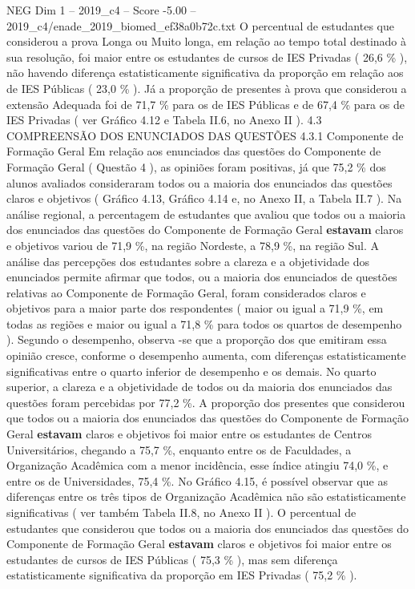 \begin{textsample}{NEG Dim 1 – 2019\_c4 – Score -5.00 – 2019\_c4/enade\_2019\_biomed\_ef38a0b72c.txt}
O percentual de estudantes que considerou a prova Longa ou Muito longa, em relação ao tempo total destinado à sua resolução, foi maior entre os estudantes de cursos de IES Privadas ( 26,6 \% ), não havendo diferença estatisticamente significativa da proporção em relação aos de IES Públicas ( 23,0 \% ).
Já a proporção de presentes à prova que considerou a extensão Adequada foi de 71,7 \% para os de IES Públicas e de 67,4 \% para os de IES Privadas ( ver Gráfico 4.12 e Tabela II.6, no Anexo II ). 4.3 COMPREENSÃO DOS ENUNCIADOS DAS QUESTÕES 4.3.1 Componente de Formação Geral Em relação aos enunciados das questões do Componente de Formação Geral ( Questão 4 ), as opiniões foram positivas, já que 75,2 \% dos alunos avaliados consideraram todos ou a maioria dos enunciados das questões claros e objetivos ( Gráfico 4.13, Gráfico 4.14 e, no Anexo II, a Tabela II.7 ).
Na análise regional, a percentagem de estudantes que avaliou que todos ou a maioria dos enunciados das questões do Componente de Formação Geral \textbf{estavam} claros e objetivos variou de 71,9 \%, na região Nordeste, a 78,9 \%, na região Sul.
A análise das percepções dos estudantes sobre a clareza e a objetividade dos enunciados permite afirmar que todos, ou a maioria dos enunciados de questões relativas ao Componente de Formação Geral, foram considerados claros e objetivos para a maior parte dos respondentes ( maior ou igual a 71,9 \%, em todas as regiões e maior ou igual a 71,8 \% para todos os quartos de desempenho ).
Segundo o desempenho, observa -se que a proporção dos que emitiram essa opinião cresce, conforme o desempenho aumenta, com diferenças estatisticamente significativas entre o quarto inferior de desempenho e os demais.
No quarto superior, a clareza e a objetividade de todos ou da maioria dos enunciados das questões foram percebidas por 77,2 \%.
A proporção dos presentes que considerou que todos ou a maioria dos enunciados das questões do Componente de Formação Geral \textbf{estavam} claros e objetivos foi maior entre os estudantes de Centros Universitários, chegando a 75,7 \%, enquanto entre os de Faculdades, a Organização Acadêmica com a menor incidência, esse índice atingiu 74,0 \%, e entre os de Universidades, 75,4 \%.
No Gráfico 4.15, é possível observar que as diferenças entre os três tipos de Organização Acadêmica não são estatisticamente significativas ( ver também Tabela II.8, no Anexo II ).
O percentual de estudantes que considerou que todos ou a maioria dos enunciados das questões do Componente de Formação Geral \textbf{estavam} claros e objetivos foi maior entre os estudantes de cursos de IES Públicas ( 75,3 \% ), mas sem diferença estatisticamente significativa da proporção em IES Privadas ( 75,2 \% ).

\end{textsample}
